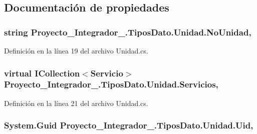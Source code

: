 \subsection{Documentación de propiedades}
\hypertarget{class_proyecto___integrador__3_1_1_tipos_dato_1_1_unidad_a75d59e9f06c1422def3f8630d2a33642}{
\subsubsection[{No\-Unidad}]{\setlength{\rightskip}{0pt plus 5cm}string Proyecto\-\_\-\-Integrador\-\_.\-Tipos\-Dato.\-Unidad.\-No\-Unidad\hspace{0.3cm}{\ttfamily [get]}, {\ttfamily [set]}}}\label{class_proyecto___integrador__3_1_1_tipos_dato_1_1_unidad_a75d59e9f06c1422def3f8630d2a33642}


Definición en la línea 19 del archivo Unidad.\-cs.

\hypertarget{class_proyecto___integrador__3_1_1_tipos_dato_1_1_unidad_aca85e685e50da0af6be67e3ee69b1bb1}{
\subsubsection[{Servicios}]{\setlength{\rightskip}{0pt plus 5cm}virtual I\-Collection$<${\bf Servicio}$>$ Proyecto\-\_\-\-Integrador\-\_.\-Tipos\-Dato.\-Unidad.\-Servicios\hspace{0.3cm}{\ttfamily [get]}, {\ttfamily [set]}}}\label{class_proyecto___integrador__3_1_1_tipos_dato_1_1_unidad_aca85e685e50da0af6be67e3ee69b1bb1}


Definición en la línea 21 del archivo Unidad.\-cs.

\hypertarget{class_proyecto___integrador__3_1_1_tipos_dato_1_1_unidad_aa2e602251694986f3d519ee3db5ffa38}{
\subsubsection[{Uid}]{\setlength{\rightskip}{0pt plus 5cm}System.\-Guid Proyecto\-\_\-\-Integrador\-\_.\-Tipos\-Dato.\-Unidad.\-Uid\hspace{0.3cm}{\ttfamily [get]}, {\ttfamily [set]}}}\label{class_proyecto___integrador__3_1_1_tipos_dato_1_1_unidad_aa2e602251694986f3d519ee3db5ffa38}


